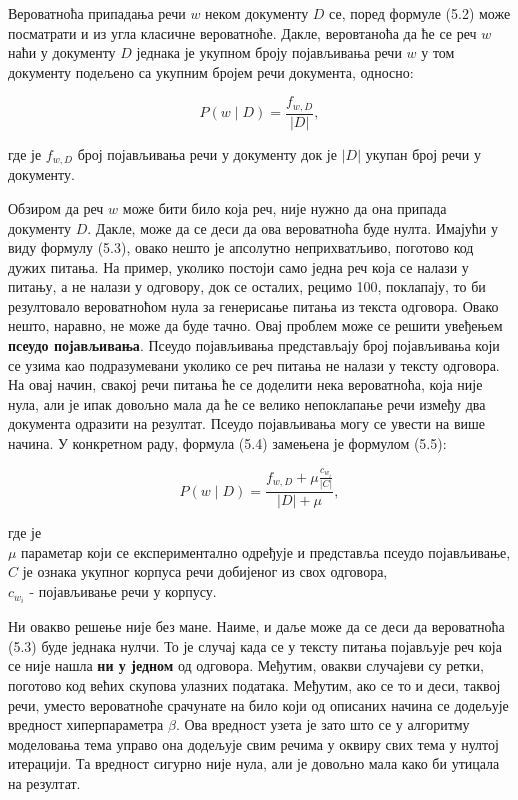 Вероватноћа припадања речи $w$ неком документу $D$ се, поред формуле (5.2) може посматрати и из угла класичне вероватноће. Дакле, веровтаноћа да ће се реч $w$ наћи у документу $D$ једнака је укупном броју појављивања речи $w$ у том документу подељено са укупним бројем речи документа, односно:

\begin{equation}
P(w \mid D) = \frac{f_{w,D}}{|D|},
\end{equation}

где је $f_{w,D}$ број појављивања речи у документу док је $|D|$ укупан број речи у документу.

Обзиром да реч $w$ може бити било која реч, није нужно да она припада документу $D$. Дакле, може да се деси да ова вероватноћа буде нулта. Имајући у виду формулу (5.3), овако нешто је апсолутно неприхватљиво, поготово код дужих питања. На пример, уколико постоји само једна реч која се налази у питању, а не налази у одговору, док се осталих, рецимо 100, поклапају, то би резултовало вероватноћом  нула за генерисање питања из текста одговора. Овако нешто, наравно, не може да буде тачно.
Овај проблем може се решити увеђењем \textbf{псеудо појављивања}. 
Псеудо појављивања представљају број појављивања који се узима као подразумевани уколико се реч питања не налази у тексту одговора. На овај начин, свакој речи питања ће се доделити нека вероватноћа, која није нула, али је ипак довољно мала да ће се велико непоклапање речи између два документа одразити на резултат. Псеудо појављивања могу се увести на више начина. У конкретном раду, формула (5.4) замењена је формулом (5.5):

\begin{equation}
P(w \mid D) = \frac{f_{w,D} + \mu\frac{c_{w_i}}{|C|}}{|D|+\mu},
\end{equation}

где је\\
$\mu$ параметар који се експериментално одређује и представља псеудо појављивање,\\
$C$ је ознака укупног корпуса речи добијеног из свох одговора,
\\
$c_{w_i}$ - појављивање речи у корпусу.

Ни овакво решење није без мане. Наиме, и даље може да се деси да вероватноћа (5.3) буде једнака нулчи. То је случај када се у тексту питања појављује реч која се није нашла \textbf{ни у једном} од одговора. Међутим, овакви случајеви су ретки, поготово код већих скупова улазних података. Међутим, ако се то и деси, таквој речи, уместо вероватноће срачунате на било који од описаних начина се додељује вредност хиперпараметра $\beta$. Ова вредност узета је зато што се у алгоритму моделовања тема управо она додељује свим речима у оквиру свих тема у нултој итерацији. Та вредност сигурно није нула, али је довољно мала како би утицала на резултат.

